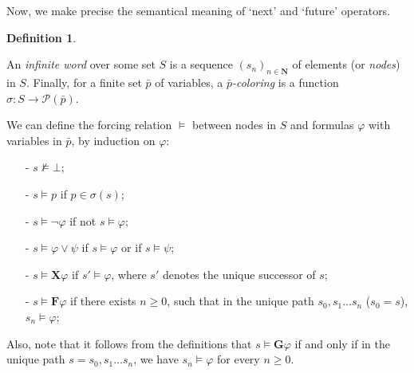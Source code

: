 \documentclass[11pt]{article}
\newcommand{\X}{{\mathbf{X}}}
\newcommand{\F}{{\mathbf{F}}}
\newcommand{\phii}{{\varphi}}
\newcommand{\G}{{\mathbf{G}}}
\theoremstyle{definition}
\newtheorem{definition}{Definition}
\begin{document}
Now, we make precise the semantical meaning of `next' and `future' operators.
\begin{definition}\label{infinite word}
   
    An \emph{infinite word} over some set $S$ is a sequence ${(s_n)}_{n\in\mathbf{N}}$ of 
    elements (or \emph{nodes}) in $S$. 
    Finally, for a finite set $\bar{p}$ of
    variables, a \emph{$\bar{p}$-coloring} is a function $\sigma : S \to \mathcal{P}(\bar{p})$.

    We can define the forcing relation $\models$ between nodes in $S$ and formulas $\phii$ with 
    variables in $\bar{p}$, by induction on $\phii$:
    \begin{itemize}
        \setlength\itemsep{0em}
        \item[-] $s\not\models \bot$;
        \item[-] $s \models p$ if $p \in \sigma(s)$;
        \item[-] $s \models \neg\phii$ if not $s \models \phii$;
        \item[-] $s \models \phii \vee \psi$ if $s\models \phii$ or if $s\models \psi$;
        \item[-] $s\models \X\phii$ if $s'\models \phii$, where $s'$ denotes the unique successor of $s$;
        \item[-] $s\models \F\phii$ if there exists $n\geq 0$, such that in the unique path 
            $s_0,s_1\ldots s_n$ ($s_0=s$), $s_n\models\phii$;      
    \end{itemize}

\end{definition}

Also, note that it follows from the definitions that $s\models \G\phii$ if and only if in the unique path $s=s_0,s_1\ldots s_n$, we have
$s_n\models\phii$ for every $n\geq 0$.
\end{document}
